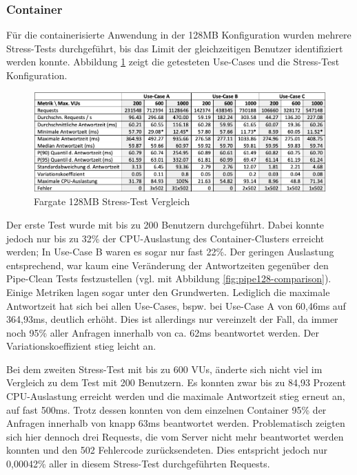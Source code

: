 \subsubsection{Container}
Für die containerisierte Anwendung in der 128MB Konfiguration wurden mehrere Stress-Tests durchgeführt, bis das Limit der gleichzeitigen Benutzer identifiziert werden konnte. Abbildung \ref{fig:fargate128-stress-comparison} zeigt die getesteten Use-Cases und die Stress-Test Konfiguration. 

\begin{figure}[H]
    \includegraphics[width=\textwidth]{img/fargate128-stress-comparison.png}
    \caption[Fargate 128MB Stress-Test Vergleich]{Fargate 128MB Stress-Test Vergleich}
    \label{fig:fargate128-stress-comparison}
\end{figure}

Der erste Test wurde mit bis zu 200 Benutzern durchgeführt. Dabei konnte jedoch nur bis zu 32\% der CPU-Auslastung des Container-Clusters erreicht werden; In Use-Case B waren es sogar nur fast 22\%. Der geringen Auslastung entsprechend, war kaum eine Veränderung der Antwortzeiten gegenüber den Pipe-Clean Tests festzustellen (vgl. mit Abbildung \ref{fig:pipe128-comparison}). Einige Metriken lagen sogar unter den Grundwerten. Lediglich die maximale Antwortzeit hat sich bei allen Use-Cases, bspw. bei Use-Case A von 60,46ms auf 364,93ms, deutlich erhöht. Dies ist allerdings nur vereinzelt der Fall, da immer noch 95\% aller Anfragen innerhalb von ca. 62ms beantwortet werden. Der Variationskoeffizient stieg leicht an. 

Bei dem zweiten Stress-Test mit bis zu 600 VUs, änderte sich nicht viel im Vergleich zu dem Test mit 200 Benutzern. Es konnten zwar bis zu 84,93 Prozent CPU-Auslastung erreicht werden und die maximale Antwortzeit stieg erneut an, auf fast 500ms. Trotz dessen konnten von dem einzelnen Container 95\% der Anfragen innerhalb von knapp 63ms beantwortet werden. Problematisch zeigten sich hier dennoch drei Requests, die vom Server nicht mehr beantwortet werden konnten und den 502 Fehlercode zurücksendeten. Dies entspricht jedoch nur 0,00042\% aller in diesem Stress-Test durchgeführten Requests.

